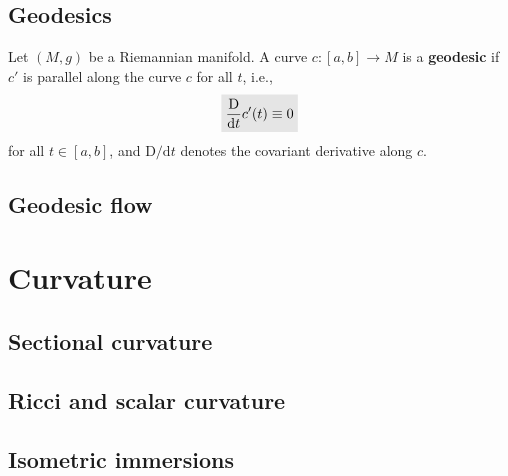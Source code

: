 \documentclass[letter-paper]{tufte-book}
\newcommand{\highlight}[1]{\mathchoice%
  {\colorbox{black!10}{$\displaystyle#1$}}%
  {\colorbox{black!10}{$\textstyle#1$}}%
  {\colorbox{black!10}{$\scriptstyle#1$}}%
  {\colorbox{black!10}{$\scriptscriptstyle#1$}}}%
\begin{document}

\section{Geodesics}

Let $(M,g)$ be a Riemannian manifold. A  curve $c:[a,b] \to M$ is a \textbf{geodesic} if $c'$ is parallel along the curve $c$ for all $t$, i.e.,
\begin{equation}
  \highlight{\frac{\mathrm{D}}{\mathrm{d}t} c'(t) \equiv 0}
\end{equation}
for all $t\in[a,b]$, and $\mathrm{D}/\mathrm{d}t$ denotes the covariant derivative along $c$.


\section{Geodesic flow}


\chapter{Curvature}


\section{Sectional curvature}


\section{Ricci and scalar curvature}


\section{Isometric immersions}

\end{document}
